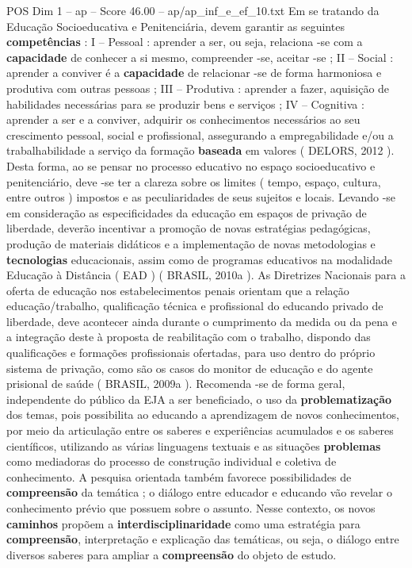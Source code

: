\begin{textsample}{POS Dim 1 – ap – Score 46.00 – ap/ap\_inf\_e\_ef\_10.txt}
Em se tratando da Educação Socioeducativa e Penitenciária, devem garantir as seguintes \textbf{competências} : I – Pessoal : aprender a ser, ou seja, relaciona -se com a \textbf{capacidade} de conhecer a si mesmo, compreender -se, aceitar -se ; II – Social : aprender a conviver é a \textbf{capacidade} de relacionar -se de forma harmoniosa e produtiva com outras pessoas ; III – Produtiva : aprender a fazer, aquisição de habilidades necessárias para se produzir bens e serviços ; IV – Cognitiva : aprender a ser e a conviver, adquirir os conhecimentos necessários ao seu crescimento pessoal, social e profissional, assegurando a empregabilidade e/ou a trabalhabilidade a serviço da formação \textbf{baseada} em valores ( DELORS, 2012 ).
Desta forma, ao se pensar no processo educativo no espaço socioeducativo e penitenciário, deve -se ter a clareza sobre os limites ( tempo, espaço, cultura, entre outros ) impostos e as peculiaridades de seus sujeitos e locais.
Levando -se em consideração as especificidades da educação em espaços de privação de liberdade, deverão incentivar a promoção de novas estratégias pedagógicas, produção de materiais didáticos e a implementação de novas metodologias e \textbf{tecnologias} educacionais, assim como de programas educativos na modalidade Educação à Distância ( EAD ) ( BRASIL, 2010a ).
As Diretrizes Nacionais para a oferta de educação nos estabelecimentos penais orientam que a relação educação/trabalho, qualificação técnica e profissional do educando privado de liberdade, deve acontecer ainda durante o cumprimento da medida ou da pena e a integração deste à proposta de reabilitação com o trabalho, dispondo das qualificações e formações profissionais ofertadas, para uso dentro do próprio sistema de privação, como são os casos do monitor de educação e do agente prisional de saúde ( BRASIL, 2009a ).
Recomenda -se de forma geral, independente do público da EJA a ser beneficiado, o uso da \textbf{problematização} dos temas, pois possibilita ao educando a aprendizagem de novos conhecimentos, por meio da articulação entre os saberes e experiências acumulados e os saberes científicos, utilizando as várias linguagens textuais e as situações \textbf{problemas} como mediadoras do processo de construção individual e coletiva de conhecimento.
A pesquisa orientada também favorece possibilidades de \textbf{compreensão} da temática ; o diálogo entre educador e educando vão revelar o conhecimento prévio que possuem sobre o assunto.
Nesse contexto, os novos \textbf{caminhos} propõem a \textbf{interdisciplinaridade} como uma estratégia para \textbf{compreensão}, interpretação e explicação das temáticas, ou seja, o diálogo entre diversos saberes para ampliar a \textbf{compreensão} do objeto de estudo.

\end{textsample}
